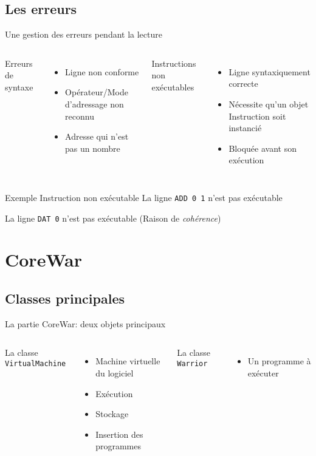 \documentclass{beamer}
\begin{document}
\subsection{Les erreurs}
\begin{frame}%
\begin{center}
Une gestion des erreurs pendant la lecture
\end{center}
\begin{columns}
Erreurs de syntaxe
\begin{itemize}
    \item Ligne non conforme
    \item Opérateur/Mode d'adressage non reconnu
    \item Adresse qui n'est pas un nombre
\end{itemize}
Instructions non exécutables
\begin{itemize}
    \item Ligne syntaxiquement correcte
    \item Nécessite qu'un objet Instruction soit instancié
    \item Bloquée avant son exécution
\end{itemize}
\end{columns}
\begin{exampleblock}{Exemple Instruction non exécutable}
La ligne \texttt{ADD 0 1} n'est pas exécutable

La ligne \texttt{DAT 0} n'est pas exécutable (Raison de \emph{cohérence})
\end{exampleblock}
\end{frame}

\section{CoreWar}

\subsection{Classes principales}
\begin{frame}%
\begin{center}
{\Large La partie CoreWar: deux objets principaux}
\end{center}
\begin{columns}
La classe \texttt{VirtualMachine}
\begin{itemize}
    \item Machine virtuelle du logiciel
    \item Exécution
    \item Stockage
    \item Insertion des programmes
\end{itemize}
La classe \texttt{Warrior}
\begin{itemize}
    \item Un programme à exécuter
\end{itemize}
\end{columns}
\end{frame}
\end{document}

